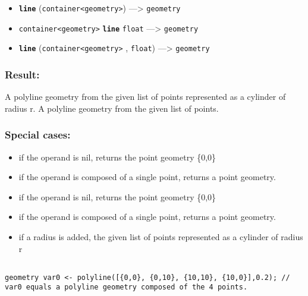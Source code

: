 \documentclass[]{book}
\providecommand{\tightlist}{%
  \setlength{\itemsep}{0pt}\setlength{\parskip}{0pt}}
\theoremstyle{definition}
\theoremstyle{definition}
\theoremstyle{definition}
\theoremstyle{remark}
\begin{document}
\begin{itemize}
\tightlist
\item
  \textbf{\texttt{line}}
  (\texttt{container\textless{}geometry\textgreater{}})
  ---\textgreater{} \texttt{geometry}
\item
  \texttt{container\textless{}geometry\textgreater{}}
  \textbf{\texttt{line}} \texttt{float} ---\textgreater{}
  \texttt{geometry}
\item
  \textbf{\texttt{line}}
  (\texttt{container\textless{}geometry\textgreater{}} , \texttt{float})
  ---\textgreater{} \texttt{geometry}
\end{itemize}

\subsubsection{Result:}\label{result-311}

A polyline geometry from the given list of points represented as a
cylinder of radius r. A polyline geometry from the given list of points.

\subsubsection{Special cases:}\label{special-cases-88}

\begin{itemize}
\tightlist
\item
  if the operand is nil, returns the point geometry \{0,0\}\\
\item
  if the operand is composed of a single point, returns a point
  geometry.\\
\item
  if the operand is nil, returns the point geometry \{0,0\}\\
\item
  if the operand is composed of a single point, returns a point
  geometry.\\
\item
  if a radius is added, the given list of points represented as a
  cylinder of radius r
\end{itemize}

\begin{verbatim}
 
geometry var0 <- polyline([{0,0}, {0,10}, {10,10}, {10,0}],0.2); // var0 equals a polyline geometry composed of the 4 points.
\end{verbatim}
\end{document}
